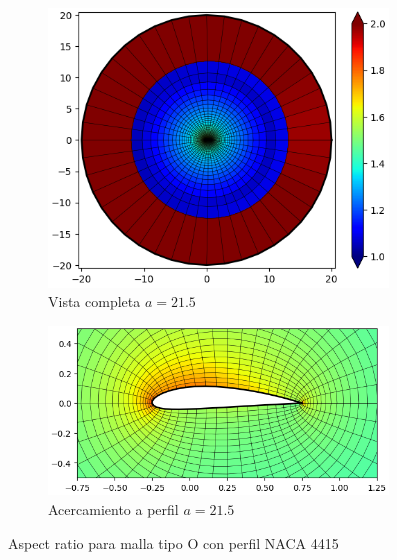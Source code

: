 \documentclass[letterpaper, openright, 12pt]{book}
\begin{document}
\begin{figure}[htbp!]
\begin{subfigure}[c]{0.48\textwidth}
            \includegraphics[keepaspectratio,
                width=0.99\textwidth]{./img/naca4415_aa_215_aspect_far}
            \caption{Vista completa $a=21.5$}
            \label{fig:naca4415_aa_215_aspect_far}
        \end{subfigure}
        \hfill
        \begin{subfigure}[c]{0.48\textwidth}
            \includegraphics[keepaspectratio,
                width=0.99\textwidth]{./img/naca4415_aa_215_aspect_close}
            \caption{Acercamiento a perfil $a=21.5$}
            \label{fig:naca4415_aa_215_aspect_close}
        \end{subfigure}
        \caption[Aspect ratio para malla tipo O con perfil NACA 4415]{Aspect
            ratio para malla tipo O con perfil NACA 4415}
    \end{figure}
\end{document}
